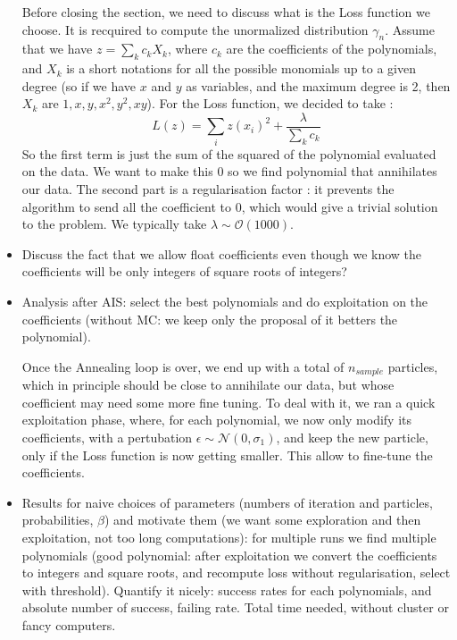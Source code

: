 \documentclass[11pt]{article}
\begin{document}
\begin{itemize}[label=\textbullet]
		Before closing the section, we need to discuss what is the Loss function we choose. It is recquired to compute the unormalized distribution $\gamma_n$. Assume that we have $z = \sum_k c_k X_k$, where $c_k$ are the coefficients of the polynomials, and $X_k$ is a short notations for all the possible monomials up to a given degree (so if we have $x$ and $y$ as variables, and the maximum degree is 2, then $X_k$ are $1, x, y, x^2, y^2, x y$). For the Loss function, we decided to take : 
		\begin{equation}
			L(z) = \sum_{i} z(x_i)^2 + \frac{\lambda}{\sum_k c_k}
		\end{equation}
		So the first term is just the sum of the squared of the polynomial evaluated on the data. We want to make this 0 so we find polynomial that annihilates our data. The second part is a regularisation factor : it prevents the algorithm to send all the coefficient to 0, which would give a trivial solution to the problem. We typically take $\lambda \sim \mathcal{O}(1000)$.

		\item Discuss the fact that we allow float coefficients even though we know the coefficients will be only integers of square roots of integers?
		
		\item Analysis after AIS: select the best polynomials and do exploitation on the coefficients (without MC: we keep only the proposal of it betters the polynomial).
		
		Once the Annealing loop is over, we end up with a total of $n_{sample}$ particles, which in principle should be close to annihilate our data, but whose coefficient may need some more fine tuning. To deal with it, we ran a quick exploitation phase, where, for each polynomial, we now only modify its coefficients, with a pertubation $\epsilon \sim \mathcal{N}(0, \sigma_1)$, and keep the new particle, only if the Loss function is now getting smaller. This allow to fine-tune the coefficients. 
		
		\item Results for naive choices of parameters (numbers of iteration and particles, probabilities, $\beta$) and motivate them (we want some exploration and then exploitation, not too long computations): for multiple runs we find multiple polynomials (good polynomial: after exploitation we convert the coefficients to integers and square roots, and recompute loss without regularisation, select with threshold). Quantify it nicely: success rates for each polynomials, and absolute number of success, failing rate. Total time needed, without cluster or fancy computers.
	\end{itemize}
	
\end{document}
